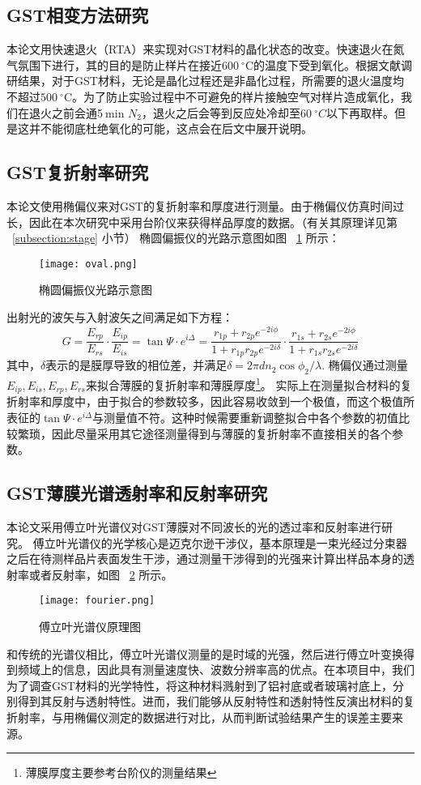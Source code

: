\subsection{GST相变方法研究}
本论文用快速退火（RTA）来实现对GST材料的晶化状态的改变。快速退火在氮气氛围下进行，其的目的是防止样片在接近$600\ ^{\circ}$C的温度下受到氧化。根据文献\cite{annealing}调研结果，对于GST材料，无论是晶化过程还是非晶化过程，所需要的退火温度均不超过$500\ ^{\circ}$C。为了防止实验过程中不可避免的样片接触空气对样片造成氧化，我们在退火之前会通5$\ $min $N_{2}$，退火之后会等到反应处冷却至$60\ ^ \circ{} C$以下再取样。但是这并不能彻底杜绝氧化的可能，这点会在后文中展开说明。

\subsection{GST复折射率研究}
本论文使用椭偏仪来对GST的复折射率和厚度进行测量。由于椭偏仪仿真时间过长，因此在本次研究中采用台阶仪来获得样品厚度的数据。（有关其原理详见第 ~\ref{subsection:stage} 小节）
椭圆偏振仪的光路示意图如图 ~\ref{fig:oval} 所示：
\begin{figure}[H] %
  \centering
  \texttt{[image: oval.png]}
  \caption{椭圆偏振仪光路示意图}
  \label{fig:oval}
\end{figure}
出射光的波矢与入射波矢之间满足如下方程：
\begin{equation}
G = \frac{E_{rp}}{E_{rs}} \cdot{} \frac{E_{ip}}{E_{is}} = \tan{\Psi \cdot{} e^{i \Delta}} = \frac{r_{1p}+r_{2p}e^{-2i \phi}}{1 + r_{1p}r_{2p}e^{-2i \delta}} \cdot{} \frac{r_{1s}+r_{2s}e^{-2i \phi}}{1 + r_{1s}r_{2s}e^{-2i \delta}}
\end{equation}
其中，$\delta$表示的是膜厚导致的相位差，并满足$\delta = 2 \pi dn_{2} \cos{\phi_{2}} / \lambda$. 椭偏仪通过测量$E_{ip}, E_{is}, E_{rp}, E_{rs}$来拟合薄膜的复折射率和薄膜厚度\footnote{薄膜厚度主要参考台阶仪的测量结果}。
实际上在测量拟合材料的复折射率和厚度中，由于拟合的参数较多，因此容易收敛到一个极值，而这个极值所表征的$\tan{\Psi \cdot{} e^{i \Delta}}$与测量值不符。这种时候需要重新调整拟合中各个参数的初值比较繁琐，因此尽量采用其它途径测量得到与薄膜的复折射率不直接相关的各个参数。

\subsection{GST薄膜光谱透射率和反射率研究}
本论文采用傅立叶光谱仪对GST薄膜对不同波长的光的透过率和反射率进行研究。
傅立叶光谱仪的光学核心是迈克尔逊干涉仪，基本原理是一束光经过分束器之后在待测样品片表面发生干涉，通过测量干涉得到的光强来计算出样品本身的透射率或者反射率，如图 ~\ref{fig:fourier} 所示。
\begin{figure}[H] %
  \centering
  \texttt{[image: fourier.png]}
  \caption{傅立叶光谱仪原理图}
  \label{fig:fourier}
\end{figure}
和传统的光谱仪相比，傅立叶光谱仪测量的是时域的光强，然后进行傅立叶变换得到频域上的信息，因此具有测量速度快、波数分辨率高的优点。在本项目中，我们为了调查GST材料的光学特性，将这种材料溅射到了铝衬底或者玻璃衬底上，分别得到其反射与透射特性。进而，我们能够从反射特性和透射特性反演出材料的复折射率，与用椭偏仪测定的数据进行对比，从而判断试验结果产生的误差主要来源。

